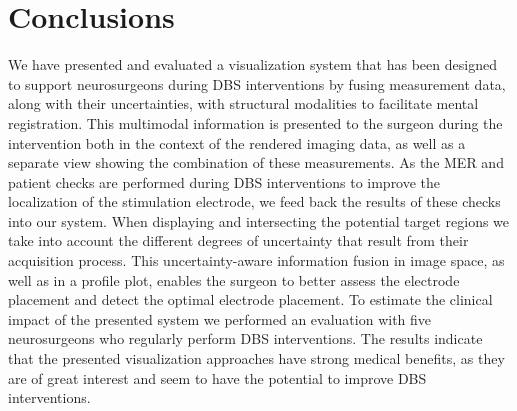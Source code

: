 \documentclass{egpubl}
\begin{document}
\section{Conclusions}\label{sec:conclusions}
We have presented and evaluated a visualization system that has been designed to support neurosurgeons during DBS interventions by fusing measurement data, along with their uncertainties, with structural modalities to facilitate mental registration. This multimodal information is presented to the surgeon during the intervention both in the context of the rendered imaging data, as well as a separate view showing the combination of these measurements. As the MER and patient checks are performed during DBS interventions to improve the localization of the stimulation electrode, we feed back the results of these checks into our system. When displaying and intersecting the potential target regions we take into account the different degrees of uncertainty that result from their acquisition process. This uncertainty-aware information fusion in image space, as well as in a profile plot, enables the surgeon to better assess the electrode placement and detect the optimal electrode placement. To estimate the clinical impact of the presented system we performed an evaluation with five neurosurgeons who regularly perform DBS interventions. The results indicate that the presented visualization approaches have strong medical benefits, as they are of great interest and seem to have the potential to improve DBS interventions.
%



\end{document}
